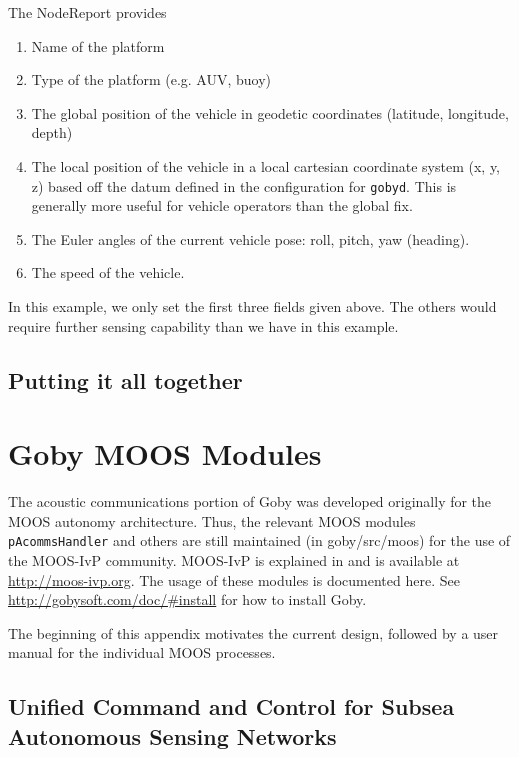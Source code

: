 \documentclass[11pt, letterpaper, oneside]{memoir}
\begin{document}
The NodeReport provides
\begin{enumerate}
\item Name of the platform
\item Type of the platform (e.g. AUV, buoy)
\item The global position of the vehicle in geodetic coordinates (latitude, longitude, depth)
\item The local position of the vehicle in a local cartesian coordinate system (x, y, z) based off the datum defined in the configuration for \verb|gobyd|. This is generally more useful for vehicle operators than the global fix.
\item The Euler angles of the current vehicle pose: roll, pitch, yaw (heading). 
\item The speed of the vehicle.
\end{enumerate}

In this example, we only set the first three fields given above. The others would require further sensing capability than we have in this example.

\section{Putting it all together}

\appendix

\chapter{Goby MOOS Modules}

The acoustic communications portion of Goby was developed originally for the MOOS autonomy architecture. Thus, the relevant MOOS modules \verb|pAcommsHandler| and others are still maintained (in goby/src/moos) for the use of the MOOS-IvP community. MOOS-IvP is explained in \cite{moos-ivp-jfr} and is available at \url{http://moos-ivp.org}. The usage of these modules is documented here. See \url{http://gobysoft.com/doc/#install} for how to install Goby.

The beginning of this appendix motivates the current design, followed by a user manual for the individual MOOS processes.

\section{Unified Command and Control for Subsea Autonomous Sensing Networks}
\end{document}
